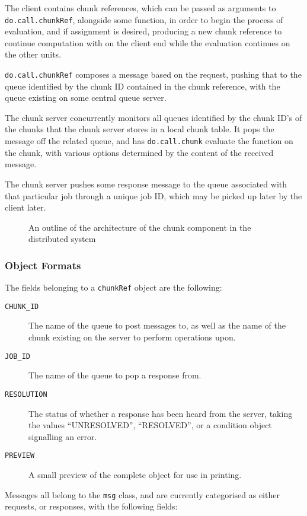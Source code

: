 The client contains chunk references, which can be passed as arguments to
\texttt{do.call.chunkRef}, alongside some function, in order to begin the
process of evaluation, and if assignment is desired, producing a new chunk
reference to continue computation with on the client end while the evaluation
continues on the other units.

\texttt{do.call.chunkRef} composes a message based on the request, pushing that
to the queue identified by the chunk ID contained in the chunk reference, with
the queue existing on some central queue server.

The chunk server concurrently monitors all queues identified by the chunk ID's
of the chunks that the chunk server stores in a local chunk table.
It pops the message off the related queue, and has \texttt{do.call.chunk}
evaluate the function on the chunk, with various options determined by the
content of the received message.

The chunk server pushes some response message to the queue associated with that
particular job through a unique job ID, which may be picked up later by the
client later.

\begin{figure}
	\centering
	
	\caption{\label{fig:chunk-arch} An outline of the architecture of the
	chunk component in the distributed system}
\end{figure}

\newpage
\subsubsection{Object Formats}
The fields belonging to a \texttt{chunkRef} object are the following:
\begin{description}
	\item[\texttt{CHUNK\_ID}] The name of the queue to post messages to, as
		well as the name of the chunk existing on the server to perform
		operations upon.
	\item[\texttt{JOB\_ID}] The name of the queue to pop a response from.
	\item[\texttt{RESOLUTION}] The status of whether a response has been
		heard from the server, taking the values ``UNRESOLVED'',
		``RESOLVED'', or a condition object signalling an error.
	\item[\texttt{PREVIEW}] A small preview of the complete object for use
		in printing.
\end{description}

Messages all belong to the \texttt{msg} class, and are currently categorised as
either requests, or responses, with the following fields:\\

